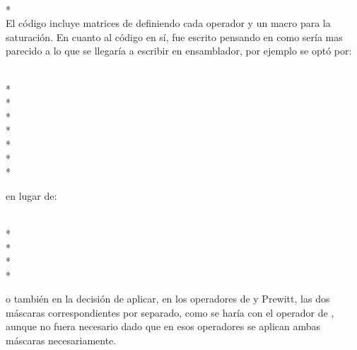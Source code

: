 \noindent{}\\*
\noindent{}\\

El c\'odigo incluye matrices de  definiendo cada operador y un macro para la saturaci\'on. En cuanto al 
c\'odigo en s\'i, fue escrito pensando en como ser\'ia mas parecido a lo que se llegar\'ia a escribir en ensamblador, por 
ejemplo se opt\'o por:\\

\begin{samepage}
\noindent{}\\*
 \\*
\\*
\\*
\\*
\\*
 \\*
\code{\small \} } \\
\end{samepage}
\noindent en lugar de:\\
\begin{samepage}
\noindent{}\\*
\\*
\\*
 \\*
\code{\small \} } \\
\end{samepage}
\noindent o tambi\'en en la decisi\'on de aplicar, en los operadores de  y Prewitt, las dos 
m\'ascaras correspondientes por separado, como se har\'ia con el operador de , aunque no fuera 
necesario dado que en esos operadores se aplican ambas m\'ascaras necesariamente.

\vspace{1cm}
